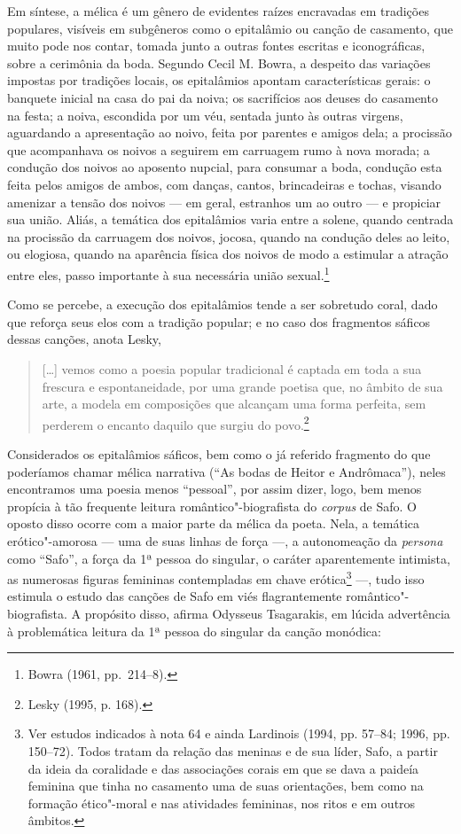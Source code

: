 Em síntese, a mélica é um gênero de evidentes raízes
encravadas em tradições populares, visíveis em subgêneros
como o epitalâmio ou canção de casamento, que muito pode nos contar, tomada
junto a outras fontes escritas e iconográficas, sobre a cerimônia
da boda. Segundo Cecil M. Bowra, a despeito das variações
impostas por tradições locais, os epitalâmios apontam características gerais:
o banquete inicial na casa do pai da noiva; os sacrifícios aos
deuses do casamento na festa; a noiva, escondida por um véu, sentada junto às
outras virgens, aguardando a apresentação ao noivo, feita por parentes e amigos
dela; a procissão que acompanhava os noivos a seguirem em carruagem rumo à nova
morada; a condução dos noivos ao aposento nupcial, para consumar a boda,
condução esta feita pelos amigos de ambos, com danças, cantos, brincadeiras e
tochas, visando amenizar a tensão dos noivos --- em geral, estranhos um ao outro
--- e propiciar sua união. Aliás, a temática dos epitalâmios varia entre a
solene, quando centrada na procissão da carruagem dos noivos, jocosa, quando na
condução deles ao leito, ou elogiosa, quando na aparência física dos noivos de
modo a estimular a atração entre eles, passo importante à sua necessária união
sexual.\footnote{ Bowra (1961, pp.~214--8).}

Como se percebe, a execução dos epitalâmios tende a ser sobretudo coral, dado
que reforça seus elos com a tradição popular; e no caso dos fragmentos sáficos
dessas canções, anota Lesky, 

\begin{quote}
\mbox[\ldots{}] vemos como a poesia popular
tradicional é captada em toda a sua frescura e espontaneidade, por uma grande
poetisa que, no âmbito de sua arte, a modela em composições que alcançam uma
forma perfeita, sem perderem o encanto daquilo que surgiu do povo.\footnote{ Lesky (1995, p. 168).}
\end{quote}

Considerados os epitalâmios sáficos, bem como o já referido fragmento do que
poderíamos chamar mélica narrativa (“As bodas de Heitor e Andrômaca”), neles
encontramos uma poesia menos “pessoal”, por assim dizer, logo, bem menos
propícia à tão frequente leitura romântico"-biografista do \textit{corpus} de
Safo. O oposto disso ocorre com a maior parte da mélica da poeta. Nela, a temática
erótico"-amorosa --- uma de suas linhas de força ---, a autonomeação da
\textit{persona} como “Safo”, a força da 1ª pessoa do singular, o caráter
aparentemente intimista, as numerosas figuras
femininas contempladas em chave erótica\footnote{Ver estudos indicados à nota 64 e ainda Lardinois (1994, pp. 57--84; 1996, pp. 150--72). Todos tratam da relação das meninas e de sua líder, Safo, a partir da ideia da coralidade e das associações corais em que se dava a paideía feminina que tinha no casamento uma de suas orientações, bem como na formação ético"-moral e nas atividades femininas, nos ritos e em outros âmbitos.} ---, tudo isso estimula o estudo das
canções de Safo em viés flagrantemente romântico"-biografista. A propósito
disso, afirma Odysseus Tsagarakis, em lúcida advertência à
problemática leitura da 1ª pessoa do singular da canção
monódica:

